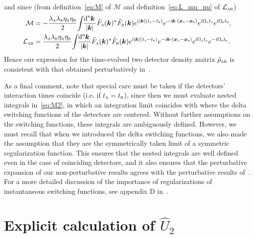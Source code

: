 \documentclass[pra,nofootinbib,floats,aps,twocolumn,tightenlines,superscriptaddress]{revtex4-1}
\renewcommand*\d[2][]{%
	\mathrm{d}%
	\ifx\relax#1\relax\else
	\rule{-0.02em}{1.5ex}^{#1}\rule{0.08em}{0ex}\!
	\fi
	#2\,
}
\newcommand{\ii}{\mathrm{i}}
\newcommand{\rhoab}{\hat{\rho}_\textsc{ab}}
\begin{document}
and since (from definition~\eqref{eq:M} of $\mathcal{M}$ and definition~\eqref{eq:L_mu_nu} of $\mathcal{L}_\textsc{ab}$)
\begin{align}
    \mathcal{M}
    &=
    -\frac{\lambda_\textsc{a}
    \lambda_\textsc{b}
    \eta_\textsc{a}
    \eta_\textsc{b}}{2}
    \!\int\!\!
    \frac{\d[n]{\bm k}}{|\bm{k}|}
    \tilde{F}_\textsc{a}(\bm k)^*
    \tilde{F}_\textsc{b}(\bm k)
    e^{\ii|\bm{k}|(t_\textsc{a}-t_\textsc{b})}
    e^{-\ii\bm{k}\cdot(\bm{x}_\textsc{a}-\bm{x}_\textsc{b})}
    e^{\ii\Omega_\textsc{a}t_\textsc{a}}
    e^{\ii\Omega_\textsc{b}t_\textsc{b}},
    \\
    \mathcal{L}_\textsc{ab}
    &=
    \frac{\lambda_\textsc{a}
    \lambda_\textsc{b}
    \eta_\textsc{a}
    \eta_\textsc{b}}{2}
    \!\int\!\!
    \frac{\d[n]{\bm k}}{|\bm{k}|}
    \tilde{F}_\textsc{a}(\bm k)^*
    \tilde{F}_\textsc{b}(\bm k)
    e^{\ii|\bm{k}|(t_\textsc{a}-t_\textsc{b})}
    e^{-\ii\bm{k}\cdot(\bm{x}_\textsc{a}-\bm{x}_\textsc{b})}
    e^{\ii\Omega_\textsc{a}t_\textsc{a}}
    e^{-\ii\Omega_\textsc{b}t_\textsc{b}}.
\end{align}
Hence our expression for the time-evolved two detector density matrix $\rhoab$ is consistent with that obtained perturbatively in~\cite{Simidzija2017b}. 

As a final comment, note that special care must be taken if the detectors' interaction times coincide (i.e. if $t_\textsc{a}=t_\textsc{b}$), since then we must evaluate nested integrals in~\eqref{eq:M2}, in which an integration limit coincides with where the delta switching functions of the detectors are centered. Without further assumptions on the switching functions, these integrals are ambiguously defined. However, we must recall that when we introduced the delta switching functions, we also made the assumption that they are the symmetrically taken limit of a symmetric regularization function. This ensures that the nested integrals are well defined even in the case of coinciding detectors, and it also ensures that the perturbative expansion of our non-perturbative results agrees with the perturbative results of~\cite{Simidzija2017b}. For a more detailed discussion of the importance of regularizations of instantaneous switching functions, see appendix D in~\cite{Pozas2017}.


\section{Explicit calculation of \texorpdfstring{$\hat{U}_2$}{}}
\label{Appendix:U2}
\end{document}
